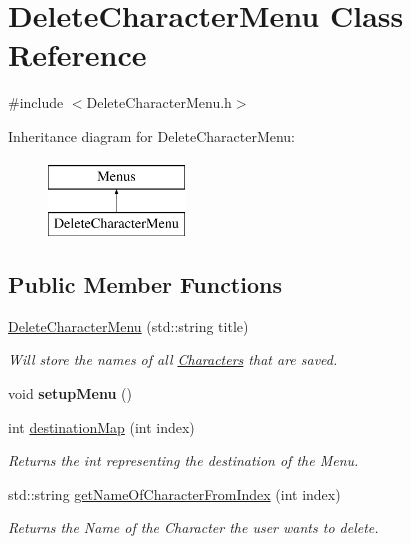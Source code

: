 \hypertarget{class_delete_character_menu}{}\section{Delete\+Character\+Menu Class Reference}
\label{class_delete_character_menu}


{\ttfamily \#include $<$Delete\+Character\+Menu.\+h$>$}

Inheritance diagram for Delete\+Character\+Menu\+:\begin{figure}[H]
\begin{center}
\leavevmode
\includegraphics[height=2.000000cm]{class_delete_character_menu}
\end{center}
\end{figure}
\subsection*{Public Member Functions}
\begin{DoxyCompactItemize}
\item 
\hyperlink{class_delete_character_menu_a3daa39ddda1956cc8615e0319bd4ebfc}{Delete\+Character\+Menu} (std\+::string title)
\begin{DoxyCompactList}\small\item\em Will store the names of all \hyperlink{class_characters}{Characters} that are saved. \end{DoxyCompactList}\item 
\hypertarget{class_delete_character_menu_a1b75e3d2a353efe1e5d840c95b597103}{}\label{class_delete_character_menu_a1b75e3d2a353efe1e5d840c95b597103} 
void {\bfseries setup\+Menu} ()
\item 
\hypertarget{class_delete_character_menu_a4b05096c3c2bb1b84abee38b59291f9e}{}\label{class_delete_character_menu_a4b05096c3c2bb1b84abee38b59291f9e} 
int \hyperlink{class_delete_character_menu_a4b05096c3c2bb1b84abee38b59291f9e}{destination\+Map} (int index)
\begin{DoxyCompactList}\small\item\em Returns the int representing the destination of the Menu. \end{DoxyCompactList}\item 
\hypertarget{class_delete_character_menu_aff97f9055254d67de54dc14bd6ed2246}{}\label{class_delete_character_menu_aff97f9055254d67de54dc14bd6ed2246} 
std\+::string \hyperlink{class_delete_character_menu_aff97f9055254d67de54dc14bd6ed2246}{get\+Name\+Of\+Character\+From\+Index} (int index)
\begin{DoxyCompactList}\small\item\em Returns the Name of the Character the user wants to delete. \end{DoxyCompactList}\end{DoxyCompactItemize}
